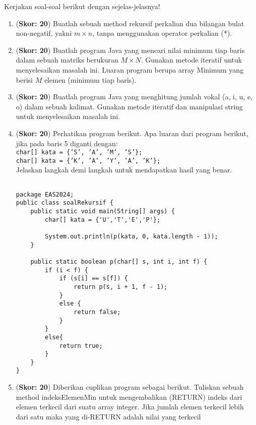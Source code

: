 \documentclass[10pt,openany,letterpaper]{article}
\begin{document}
\noindent
Kerjakan soal-soal berikut dengan sejelas-jelasnya!
\begin{enumerate}
    \item (\textbf{Skor: 20}) Buatlah sebuah method rekursif perkalian dua bilangan bulat non-negatif, yakni $m\times n$, tanpa menggunakan operator perkalian (*).
    
    \item (\textbf{Skor: 20}) Buatlah program Java yang mencari nilai minimum tiap baris dalam sebuah matriks berukuran $M \times N$. Gunakan metode iteratif untuk menyelesaikan masalah ini. Luaran program berupa array Minimum yang berisi $M$ elemen (minimum tiap baris).

    \item (\textbf{Skor: 20}) Buatlah program Java yang menghitung jumlah vokal (a, i, u, e, o) dalam sebuah kalimat. Gunakan metode iteratif dan manipulasi string untuk menyelesaikan masalah ini.
    
    \item (\textbf{Skor: 20}) Perhatikan program berikut. Apa luaran dari program berikut, jika pada baris 5 diganti dengan:\\
    \texttt{char[] kata = \{'S', 'A', 'M', 'S'\};}\\
    \texttt{char[] kata = \{'K', 'A', 'Y', 'A', 'K'\};}\\
    Jelaskan langkah demi langkah untuk mendapatkan hasil yang benar.
    \begin{verbatim}

package EAS2024;
public class soalRekursif {
    public static void main(String[] args) {
        char[] kata = {'U','T','E','P'};

        System.out.println(p(kata, 0, kata.length - 1));
    }

    public static boolean p(char[] s, int i, int f) {
        if (i < f) {
            if (s[i] == s[f]) {
                return p(s, i + 1, f - 1);
            } 
            else {
                return false;
            }
        }
        else{
            return true;
        }
    }
}

    \end{verbatim}

    \item (\textbf{Skor: 20}) Diberikan cuplikan program sebagai berikut. Tuliskan sebuah method indeksElemenMin untuk mengembalikan (RETURN) indeks dari elemen terkecil dari suatu array integer. Jika jumlah elemen terkecil lebih dari satu maka yang di-RETURN adalah nilai yang terkecil
    \begin{verbatim}


\end{verbatim}
\end{enumerate}
\end{document}
